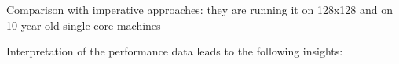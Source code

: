Comparison with imperative approaches: they are running it on 128x128 and on 10 year old single-core machines  \cite{lysenko_framework_2008}

Interpretation of the performance data leads to the following insights:
